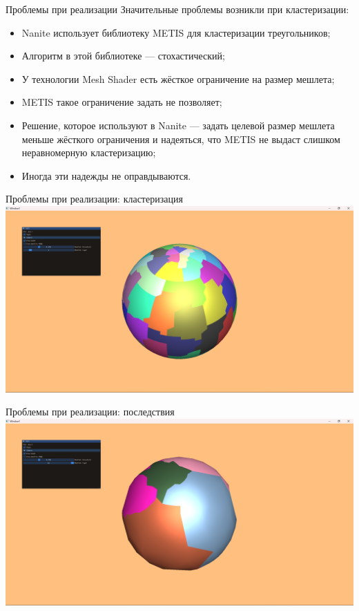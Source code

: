 \documentclass{beamer}
\begin{document}
    \begin{frame}{Проблемы при реализации}
        Значительные проблемы возникли при кластеризации:
        \begin{itemize}
            \item Nanite использует библиотеку METIS
            для кластеризации треугольников;
            \item Алгоритм в этой библиотеке --- стохастический;
            \item У технологии Mesh Shader есть жёсткое ограничение
            на размер мешлета;
            \item METIS такое ограничение задать не позволяет;
            \item Решение, которое используют в Nanite
            --- задать целевой размер мешлета меньше
            жёсткого ограничения и надеяться,
            что METIS не выдаст слишком неравномерную кластеризацию;
            \item Иногда эти надежды не оправдываются.
        \end{itemize}
    \end{frame}

    \begin{frame}{Проблемы при реализации: кластеризация}
        \includegraphics[width=\textwidth]{sphere0.png}
    \end{frame}

    \begin{frame}{Проблемы при реализации: последствия}
        \includegraphics[width=\textwidth]{sphere1.png}
    \end{frame}
\end{document}
